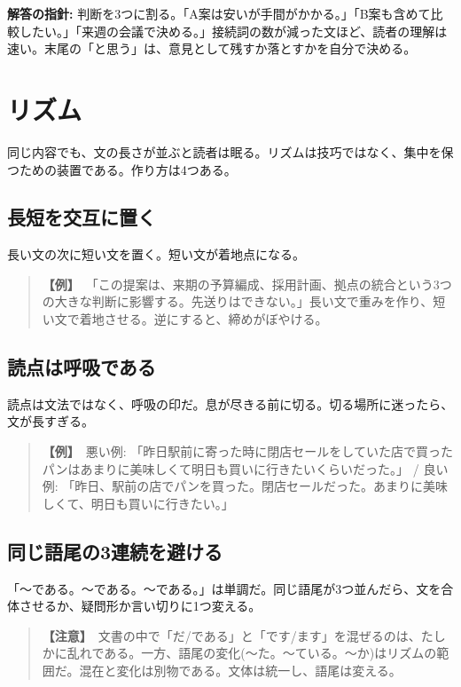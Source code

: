 \documentclass{article}
\begin{document}
\textbf{解答の指針:} 判断を3つに割る。「A案は安いが手間がかかる。」「B案も含めて比較したい。」「来週の会議で決める。」接続詞の数が減った文ほど、読者の理解は速い。末尾の「と思う」は、意見として残すか落とすかを自分で決める。

\section{リズム}

同じ内容でも、文の長さが並ぶと読者は眠る。リズムは技巧ではなく、集中を保つための装置である。作り方は4つある。

\subsection{長短を交互に置く}

長い文の次に短い文を置く。短い文が着地点になる。

\begin{quote}
\textbf{【例】}\ 「この提案は、来期の予算編成、採用計画、拠点の統合という3つの大きな判断に影響する。先送りはできない。」長い文で重みを作り、短い文で着地させる。逆にすると、締めがぼやける。
\end{quote}

\subsection{読点は呼吸である}

読点は文法ではなく、呼吸の印だ。息が尽きる前に切る。切る場所に迷ったら、文が長すぎる。

\begin{quote}
\textbf{【例】}\ 悪い例: 「昨日駅前に寄った時に閉店セールをしていた店で買ったパンはあまりに美味しくて明日も買いに行きたいくらいだった。」 / 良い例: 「昨日、駅前の店でパンを買った。閉店セールだった。あまりに美味しくて、明日も買いに行きたい。」
\end{quote}

\subsection{同じ語尾の3連続を避ける}

「〜である。〜である。〜である。」は単調だ。同じ語尾が3つ並んだら、文を合体させるか、疑問形か言い切りに1つ変える。

\begin{quote}
\textbf{【注意】}\ 文書の中で「だ/である」と「です/ます」を混ぜるのは、たしかに乱れである。一方、語尾の変化(〜た。〜ている。〜か)はリズムの範囲だ。混在と変化は別物である。文体は統一し、語尾は変える。
\end{quote}
\end{document}

